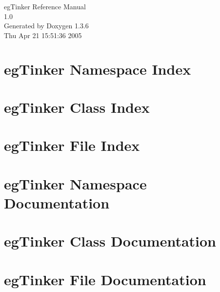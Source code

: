 \documentclass[a4paper]{book}
\begin{document}
\begin{titlepage}
\vspace*{7cm}
\begin{center}
{\Large eg\-Tinker Reference Manual\\[1ex]\large 1.0 }\\
\vspace*{1cm}
{\large Generated by Doxygen 1.3.6}\\
\vspace*{0.5cm}
{\small Thu Apr 21 15:51:36 2005}\\
\end{center}
\end{titlepage}
\clearemptydoublepage
{}
\tableofcontents
\clearemptydoublepage
{}
\chapter{eg\-Tinker Namespace Index}

\chapter{eg\-Tinker Class Index}

\chapter{eg\-Tinker File Index}

\chapter{eg\-Tinker Namespace Documentation}



\chapter{eg\-Tinker Class Documentation}



\chapter{eg\-Tinker File Documentation}

















\printindex
\end{document}
